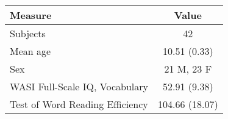 \begin{tabular}{lc}
\toprule
Measure &               Value \\
\midrule
Subjects                        &              42 \\
Mean age                        &    10.51 (0.33) \\
Sex                             &      21 M, 23 F \\
WASI Full-Scale IQ, Vocabulary  &    52.91 (9.38) \\
Test of Word Reading Efficiency &  104.66 (18.07) \\
\bottomrule
\end{tabular}